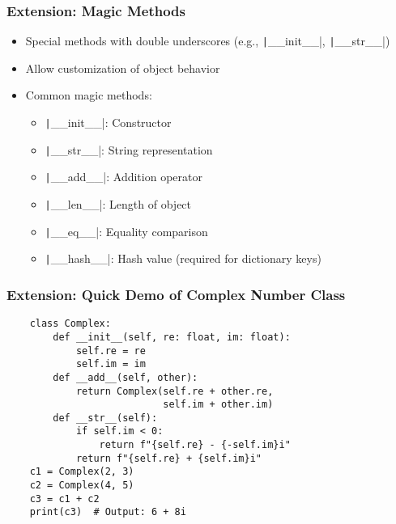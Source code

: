 \documentclass{beamer}
\newcommand{\python}[1]{\texttt|#1|}
\begin{document}
\begin{frame}
    \frametitle{Extension: Magic Methods}
    \begin{itemize}
        \item Special methods with double underscores (e.g., \python{__init__}, \python{__str__})
        \item Allow customization of object behavior
        \item Common magic methods:
              \begin{itemize}
                  \item \python{__init__}: Constructor
                  \item \python{__str__}: String representation
                  \item \python{__add__}: Addition operator
                  \item \python{__len__}: Length of object
                  \item \python{__eq__}: Equality comparison
                  \item \python{__hash__}: Hash value (required for dictionary keys)
              \end{itemize}
    \end{itemize}
\end{frame}

\begin{frame}[fragile]
    \frametitle{Extension: Quick Demo of Complex Number Class}
    \begin{verbatim}
    class Complex:
        def __init__(self, re: float, im: float):
            self.re = re
            self.im = im
        def __add__(self, other):
            return Complex(self.re + other.re,
                           self.im + other.im)
        def __str__(self):
            if self.im < 0:
                return f"{self.re} - {-self.im}i"
            return f"{self.re} + {self.im}i"
    c1 = Complex(2, 3)
    c2 = Complex(4, 5)
    c3 = c1 + c2
    print(c3)  # Output: 6 + 8i
    \end{verbatim}
\end{frame}
\end{document}
